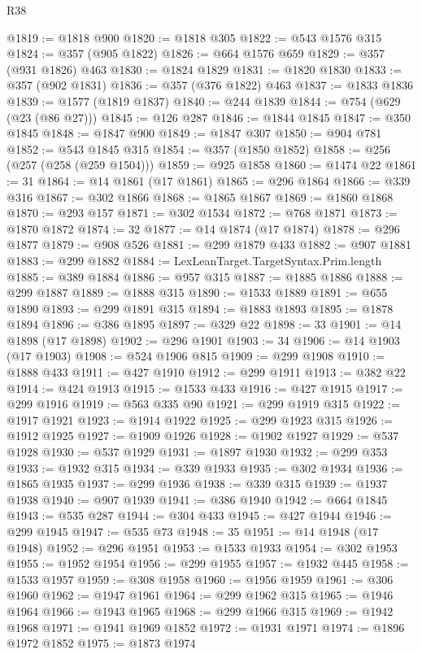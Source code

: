 \begin{lexlean}{R38}
\begin{coremodule}
@1819 := @1818 @900
@1820 := @1818 @305
@1822 := @543 @1576 @315
@1824 := @357 (@905 @1822)
@1826 := @664 @1576 @659
@1829 := @357 (@931 @1826) @463
@1830 := @1824 @1829
@1831 := @1820 @1830
@1833 := @357 (@902 @1831)
@1836 := @357 (@376 @1822) @463
@1837 := @1833 @1836
@1839 := @1577 (@1819 @1837)
@1840 := @244 @1839
@1844 := @754 (@629 (@23 (@86 @27)))
@1845 := @126 @287
@1846 := @1844 @1845
@1847 := @350 @1845
@1848 := @1847 @900
@1849 := @1847 @307
@1850 := @904 @781
@1852 := @543 @1845 @315
@1854 := @357 (@1850 @1852)
@1858 := @256 (@257 (@258 (@259 @1504)))
@1859 := @925 @1858
@1860 := @1474 @22
@1861 := 31
@1864 := @14 @1861 (@17 @1861)
@1865 := @296 @1864
@1866 := @339 @316
@1867 := @302 @1866
@1868 := @1865 @1867
@1869 := @1860 @1868
@1870 := @293 @157
@1871 := @302 @1534
@1872 := @768 @1871
@1873 := @1870 @1872
@1874 := 32
@1877 := @14 @1874 (@17 @1874)
@1878 := @296 @1877
@1879 := @908 @526
@1881 := @299 @1879 @433
@1882 := @907 @1881
@1883 := @299 @1882
@1884 := LexLeanTarget.TargetSyntax.Prim.length
@1885 := @389 @1884
@1886 := @957 @315
@1887 := @1885 @1886
@1888 := @299 @1887
@1889 := @1888 @315
@1890 := @1533 @1889
@1891 := @655 @1890
@1893 := @299 @1891 @315
@1894 := @1883 @1893
@1895 := @1878 @1894
@1896 := @386 @1895
@1897 := @329 @22
@1898 := 33
@1901 := @14 @1898 (@17 @1898)
@1902 := @296 @1901
@1903 := 34
@1906 := @14 @1903 (@17 @1903)
@1908 := @524 @1906 @815
@1909 := @299 @1908
@1910 := @1888 @433
@1911 := @427 @1910
@1912 := @299 @1911
@1913 := @382 @22
@1914 := @424 @1913
@1915 := @1533 @433
@1916 := @427 @1915
@1917 := @299 @1916
@1919 := @563 @335 @90
@1921 := @299 @1919 @315
@1922 := @1917 @1921
@1923 := @1914 @1922
@1925 := @299 @1923 @315
@1926 := @1912 @1925
@1927 := @1909 @1926
@1928 := @1902 @1927
@1929 := @537 @1928
@1930 := @537 @1929
@1931 := @1897 @1930
@1932 := @299 @353
@1933 := @1932 @315
@1934 := @339 @1933
@1935 := @302 @1934
@1936 := @1865 @1935
@1937 := @299 @1936
@1938 := @339 @315
@1939 := @1937 @1938
@1940 := @907 @1939
@1941 := @386 @1940
@1942 := @664 @1845
@1943 := @535 @287
@1944 := @304 @433
@1945 := @427 @1944
@1946 := @299 @1945
@1947 := @535 @73
@1948 := 35
@1951 := @14 @1948 (@17 @1948)
@1952 := @296 @1951
@1953 := @1533 @1933
@1954 := @302 @1953
@1955 := @1952 @1954
@1956 := @299 @1955
@1957 := @1932 @445
@1958 := @1533 @1957
@1959 := @308 @1958
@1960 := @1956 @1959
@1961 := @306 @1960
@1962 := @1947 @1961
@1964 := @299 @1962 @315
@1965 := @1946 @1964
@1966 := @1943 @1965
@1968 := @299 @1966 @315
@1969 := @1942 @1968
@1971 := @1941 @1969 @1852
@1972 := @1931 @1971
@1974 := @1896 @1972 @1852
@1975 := @1873 @1974

\end{coremodule}
\end{lexlean}
